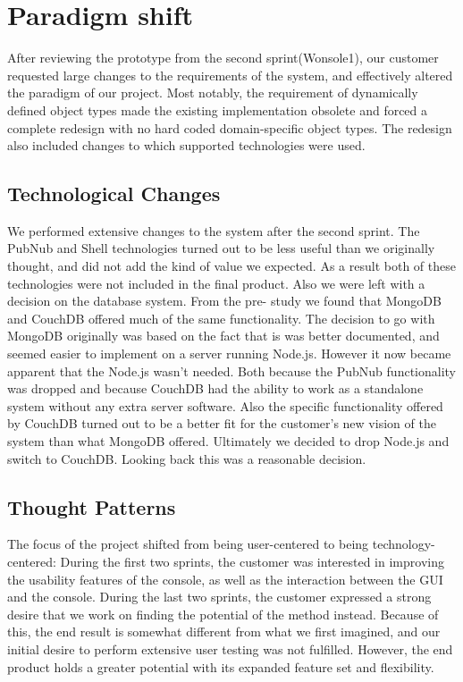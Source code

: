 \section{Paradigm shift}
After reviewing the prototype from the second sprint(Wonsole1), our customer requested large changes to the requirements of the system, and effectively altered the paradigm of our project. Most notably, the requirement of dynamically defined object types made the existing implementation obsolete and forced a complete redesign with no hard coded domain-specific object types. The redesign also included changes to which supported technologies were used.

\subsection{Technological Changes}
We performed extensive changes to the system after the second sprint. The PubNub and Shell technologies turned out to be less useful than we originally thought, and did not add the kind of value we expected. As a result both of these technologies were not included in the final product. Also we were left with a decision on the database system. From the pre- study we found that MongoDB and CouchDB offered much of the same functionality. The decision to go with MongoDB originally was based on the fact that is was better documented, and seemed easier to implement on a server running Node.js. However it now became apparent that the Node.js wasn't needed. Both because the PubNub functionality was dropped and because CouchDB had the ability to work as a standalone system without any extra server software. Also the specific functionality offered by CouchDB turned out to be a better fit for the customer's new vision of the system than what MongoDB offered. Ultimately we decided to drop Node.js and switch to CouchDB. Looking back this was a reasonable decision.

\subsection{Thought Patterns}
The focus of the project shifted from being user-centered to being technology-centered: During the first two sprints, the customer was interested in improving the usability features of the console, as well as the interaction between the GUI and the console. During the last two sprints, the customer expressed a strong desire that we work on finding the potential of the method instead. Because of this, the end result is somewhat different from what we first imagined, and our initial desire to perform extensive user testing was not fulfilled. However, the end product holds a greater potential with its expanded feature set and flexibility.

